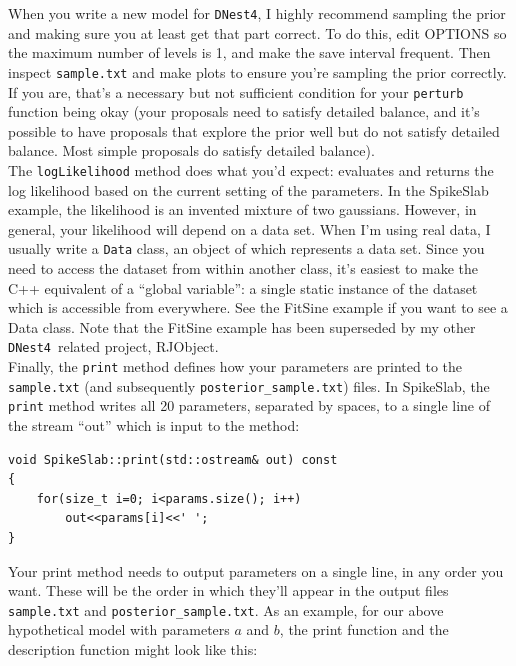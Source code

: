 \documentclass[a4paper, 11pt]{article}
\newcommand{\dnest}{{\tt DNest4}}
\begin{document}
When you write a new model for \dnest, I highly recommend sampling the prior
and making sure you at least get that part correct. To do this, edit OPTIONS
so the maximum number of levels is 1, and make the save interval frequent.
Then inspect {\tt sample.txt} and make plots to ensure you're sampling the
prior correctly. If you are, that's a necessary but not sufficient condition
for your {\tt perturb} function being okay (your proposals need to satisfy
detailed balance, and it's possible to have proposals that explore the prior
well but do not satisfy detailed balance. Most simple proposals do satisfy
detailed balance).\\

The {\tt logLikelihood} method does what you'd expect: evaluates and returns
the log likelihood based on the current setting of the parameters. In the
SpikeSlab example, the likelihood is an invented mixture of two gaussians.
However, in general, your likelihood will depend on a data set. When I'm using
real data, I usually write a {\tt Data} class, an object of which represents
a data set. Since you need to access the dataset from within another class,
it's easiest to make the C++ equivalent of a ``global variable'': a single
static instance of the dataset which is accessible from everywhere. See
the FitSine example if you want to see a Data class. Note that the FitSine
example has been superseded by my other \dnest~related project, RJObject.\\

Finally, the {\tt print} method defines how your parameters are printed to the
{\tt sample.txt} (and subsequently {\tt posterior\_sample.txt}) files. In
SpikeSlab, the {\tt print} method writes all 20 parameters, separated by
spaces, to a single line of the stream ``out'' which is input to the method:\\

\begin{framed}
\begin{verbatim}
void SpikeSlab::print(std::ostream& out) const
{
    for(size_t i=0; i<params.size(); i++)
        out<<params[i]<<' ';
}
\end{verbatim}
\end{framed}

Your print method needs to output parameters on a single line, in any order
you want. These will be the order in which they'll appear in the output files
{\tt sample.txt} and {\tt posterior\_sample.txt}. As an example, for our
above hypothetical model with parameters $a$ and $b$, the print function
and the description function might look like this:
\end{document}
